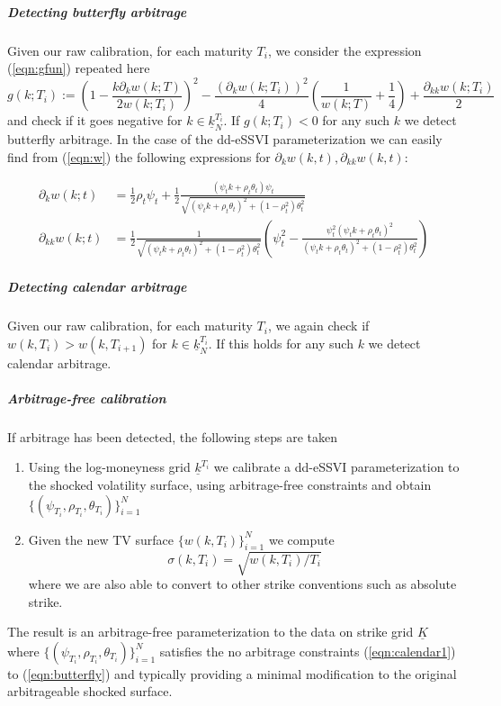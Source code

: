 \documentclass[11pt,letterpaper]{article}
\begin{document}
\subparagraph{Detecting butterfly arbitrage} 
Given our raw calibration, for each maturity $T_i$, we consider the expression (\ref{eqn:gfun}) repeated here
\[
g(k;T_i) := \left(1 - \frac{k \partial_k w(k;T)}{2 w(k;T_i)} \right)^2 - \frac{ \left( \partial_kw(k;T_i)\right)^2}{4}\left( \frac{1}{w(k;T)} + \frac{1}{4}  \right) + \frac{\partial_{kk}w(k;T_i)}{2} 
\]
and check if it goes negative for $k \in \underline{k}^{T_i}_N$. If $g(k;T_i) < 0$ for any such $k$ we detect butterfly arbitrage. In the case of the dd-eSSVI parameterization we can easily find from (\ref{eqn:w}) the following expressions for $\partial_k w(k,t), \partial_{kk} w(k,t)$:

\begin{align*}
\partial_k w(k;t) &= \frac{1}{2}\rho_t \psi_t +  \frac{1}{2}\frac{ \left(\psi_t k + \rho_t \theta_t \right)\psi_t  }{ \sqrt{ \left(\psi_t k + \rho_t \theta_t \right)^2 + \left(1-\rho^2_t\right)\theta^2_t  } } \\
\partial_{kk} w(k;t) &= \frac{1}{2}\frac{1}{ \sqrt{ (\psi_t k + \rho_t \theta_t)^2 + (1-\rho_t^2)\theta_t^2 }   } \left(  \psi_t^2 - \frac{ \psi_t^2 (\psi_tk+ \rho_t \theta_t)^2 }{(\psi_t k + \rho_t \theta_t)^2 + (1-\rho_t^2)\theta_t^2  }    \right) 
\end{align*}


\subparagraph{Detecting calendar arbitrage}
Given our raw calibration, for each maturity $T_i$, we again check if $w(k,T_i) > w(k,T_{i+1})$ for $k \in \underline{k}^{T_i}_N$. If this holds for any such $k$ we detect calendar arbitrage.


\subparagraph{Arbitrage-free calibration}
If arbitrage has been detected, the following steps are taken 

\begin{enumerate}
\item Using the log-moneyness grid $\underline{k}^{T_i}$ we calibrate a dd-eSSVI parameterization to the shocked volatility surface, using arbitrage-free constraints and obtain $\{(\psi_{T_i},\rho_{T_i},\theta_{T_i} )\}_{i=1}^N$
\item Given the new TV surface $\{ w(k,T_i) \}_{i=1}^N$ we compute 
\[
\sigma(k,T_i) = \sqrt{ w(k,T_i)/T_i }
\]
where we are also able to convert to other strike conventions such as absolute strike. 
\end{enumerate}
The result is an arbitrage-free parameterization to the data on strike grid $\underline{K}$ where $\{(\psi_{T_i},\rho_{T_i},\theta_{T_i} )\}_{i=1}^N$ satisfies the no arbitrage constraints (\ref{eqn:calendar1}) to (\ref{eqn:butterfly}) and typically providing a minimal modification to the original arbitrageable shocked surface. 
\end{document}
